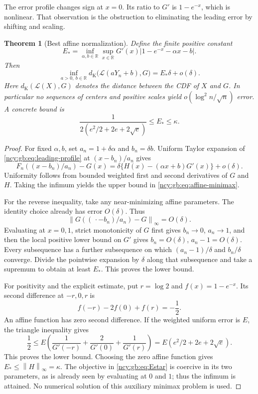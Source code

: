 \documentclass[11pt,letterpaper]{article}
\numberwithin{equation}{section}
\newtheorem{theorem}{Theorem}[section]
\theoremstyle{remark}\newtheorem{remark}[theorem]{Remark}
\theoremstyle{definition}\newtheorem{definition}[theorem]{Definition}\theoremstyle{plain}
\newcommand{\R}{\mathbb R}
\newcommand{\norminf}[1]{\left\lVert #1\right\rVert_\infty}
\newcommand{\DK}{d_{\mathrm K}}
\begin{document}
The error profile changes sign at \(x=0\). Its ratio to \(G'\)
is \(1-e^{-x}\), which is nonlinear. That observation is the
obstruction to eliminating the leading error by shifting and scaling.

\begin{theorem}[Best affine normalization]\label{ncy:gb:thm:affine}
Define the finite positive constant
\begin{equation}\label{ncy:gb:eq:Estar}
 E_*=\inf_{\alpha,b\in\R}
 \sup_{x\in\R}G'(x)\left|1-e^{-x}-\alpha x-b\right|.
\end{equation}
Then
\begin{equation}\label{ncy:gb:eq:affine-minimax}
 \inf_{a>0,\ b\in\R}
 \DK\bigl(\mathcal L(aY_n+b),G\bigr)
 =E_*\delta+o(\delta).
\end{equation}
Here \(\DK(\mathcal L(X),G)\) denotes the distance between the CDF
of \(X\) and \(G\). In particular no sequences of centers and
positive scales yield \(o(\log^2 n/\sqrt n)\) error.
A concrete bound is
\begin{equation}\label{ncy:gb:eq:Estar-bound}
 \frac{1}{2(e^2/2+2e+2\sqrt e)}
 \le E_*\le\kappa.
\end{equation}
\end{theorem}

\begin{proof}
For fixed \(\alpha,b\), set \(a_n=1+\delta\alpha\) and
\(b_n=\delta b\). Uniform Taylor expansion of
\eqref{ncy:gb:eq:leading-profile} at \((x-b_n)/a_n\) gives
\[
 F_n((x-b_n)/a_n)-G(x)
 =\delta\{H(x)-(\alpha x+b)G'(x)\}+o(\delta).
\]
Uniformity follows from bounded weighted first and second
derivatives of \(G\) and \(H\). Taking the infimum yields the
upper bound in \eqref{ncy:gb:eq:affine-minimax}.

For the reverse inequality, take any near-minimizing affine
parameters. The identity choice already has error \(O(\delta)\).
Thus
\[
 \norminf{G((\,\cdot-b_n)/a_n)-G}=O(\delta).
\]
Evaluating at \(x=0,1\), strict monotonicity of \(G\) first gives
\(b_n\to0\), \(a_n\to1\), and then the local positive lower bound
on \(G'\) gives \(b_n=O(\delta)\), \(a_n-1=O(\delta)\).
Every subsequence has a further subsequence on which
\((a_n-1)/\delta\) and \(b_n/\delta\) converge. Divide the
pointwise expansion by \(\delta\) along that subsequence and take
a supremum to obtain at least \(E_*\). This proves the lower bound.

For positivity and the explicit estimate, put \(r=\log2\) and
\(f(x)=1-e^{-x}\). Its second difference at \(-r,0,r\) is
\[
 f(-r)-2f(0)+f(r)=-\frac12.
\]
An affine function has zero second difference. If the weighted
uniform error is \(E\), the triangle inequality gives
\[
 \frac12\le E\left(\frac1{G'(-r)}
                     +\frac2{G'(0)}+\frac1{G'(r)}\right)
 =E(e^2/2+2e+2\sqrt e).
\]
This proves the lower bound. Choosing the zero affine function
gives \(E_*\le\norminf H=\kappa\).
The objective in \eqref{ncy:gb:eq:Estar} is coercive in its two
parameters, as is already seen by evaluating at \(0\) and \(1\);
thus the infimum is attained. No numerical solution of this
auxiliary minimax problem is used.
\end{proof}
\end{document}
